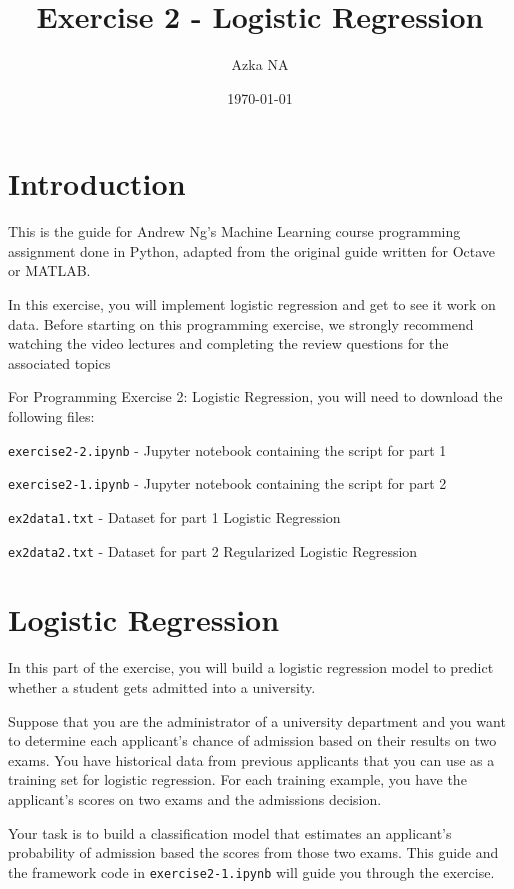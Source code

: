 \documentclass[12pt]{article}
\title{Exercise 2 - Logistic Regression}
\author{Azka NA}
\date{\today}
\begin{document}
\maketitle

\section{Introduction}
This is the guide for Andrew Ng's Machine Learning course programming assignment done in Python, adapted from the original guide written for Octave or MATLAB.

In this exercise, you will implement logistic regression and get to see it work on data. Before starting on this programming exercise, we strongly recommend watching the video lectures and completing the review questions for the associated topics

For Programming Exercise 2: Logistic Regression, you will need to download the following files:

\texttt{exercise2-2.ipynb} - Jupyter notebook containing the script for part 1

\texttt{exercise2-1.ipynb} - Jupyter notebook containing the script for part 2

\texttt{ex2data1.txt} - Dataset for part 1 Logistic Regression

\texttt{ex2data2.txt} - Dataset for part 2 Regularized Logistic Regression

\hrulefill

\section{Logistic Regression}

In this part of the exercise, you will build a logistic regression model to predict whether a student gets admitted into a university.

Suppose that you are the administrator of a university department and you want to determine each applicant’s chance of admission based on their results on two exams. You have historical data from previous applicants that you can use as a training set for logistic regression. For each training example, you have the applicant’s scores on two exams and the admissions decision.

Your task is to build a classification model that estimates an applicant’s probability of admission based the scores from those two exams. This guide and the framework code in \texttt{exercise2-1.ipynb} will guide you through the exercise.
\end{document}
